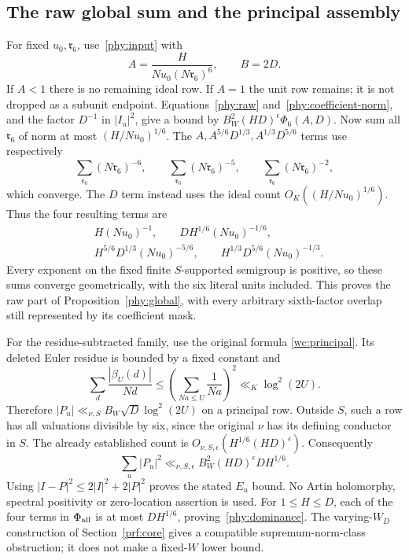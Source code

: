 \documentclass[11pt]{article}
\theoremstyle{definition}\newtheorem{definition}[theorem]{Definition}
\theoremstyle{remark}\newtheorem{remark}[theorem]{Remark}
\begin{document}
\subsection{The raw global sum and the principal assembly}\label{phy:r6-sums}
For fixed $u_0,\mathfrak r_6$, use~\eqref{phy:input} with
\[
 A=\frac{H}{Nu_0(N\mathfrak r_6)^6},\qquad B=2D.
\]
If $A<1$ there is no remaining ideal row. If $A=1$ the unit row remains;
it is not dropped as a subunit endpoint. Equations~\eqref{phy:raw}
and~\eqref{phy:coefficient-norm}, and the factor $D^{-1}$ in $|I_u|^2$,
give a bound by $B_W^2(HD)^\epsilon\Phi_6(A,D)$.
Now sum all $\mathfrak r_6$ of norm at most $(H/Nu_0)^{1/6}$.
The $A,A^{5/6}D^{1/3},A^{1/3}D^{5/6}$ terms use respectively
\[
 \sum_{\mathfrak r_6}(N\mathfrak r_6)^{-6},\qquad
 \sum_{\mathfrak r_6}(N\mathfrak r_6)^{-5},\qquad
 \sum_{\mathfrak r_6}(N\mathfrak r_6)^{-2},
\]
which converge. The $D$ term instead uses the ideal count
$O_K((H/Nu_0)^{1/6})$. Thus the four resulting terms are
\begin{equation}\label{phy:S-sums}
 \begin{aligned}
 &H(Nu_0)^{-1},\qquad DH^{1/6}(Nu_0)^{-1/6},\\
 &H^{5/6}D^{1/3}(Nu_0)^{-5/6},\qquad
       H^{1/3}D^{5/6}(Nu_0)^{-1/3}.
 \end{aligned}
\end{equation}
Every exponent on the fixed finite $S$-supported semigroup is positive,
so these sums converge geometrically, with the six literal units included.
This proves the raw part of Proposition~\ref{phy:global}, with every
arbitrary sixth-factor overlap still represented by its coefficient mask.

For the residue-subtracted family, use the original formula
\eqref{wc:principal}. Its deleted Euler residue is bounded by a fixed
constant and
\[
 \sum_d\frac{|\beta_U(d)|}{Nd}
   \le\left(\sum_{Na\le U}\frac1{Na}\right)^2
   \ll_K\log^2(2U).
\]
Therefore $|P_u|\ll_{\nu,S}B_W\sqrt D\log^2(2U)$ on a principal row.
Outside $S$, such a row has all valuations divisible by six, since the
original $\nu$ has its defining conductor in $S$. The already established
count is $O_{\nu,S,\epsilon}(H^{1/6}(HD)^\epsilon)$. Consequently
\begin{equation}\label{phy:principal-proof}
 \sum_u|P_u|^2\ll_{\nu,S,\epsilon}
               B_W^2(HD)^\epsilon DH^{1/6}.
\end{equation}
Using $|I-P|^2\le2|I|^2+2|P|^2$ proves the stated $E_u$ bound.
No Artin holomorphy, spectral positivity or zero-location assertion is used.
For $1\le H\le D$, each of the four terms in $\Phi_{\rm all}$ is at most
$DH^{1/6}$, proving~\eqref{phy:dominance}.
The varying-$W_D$ construction of Section~\ref{prf:core} gives a compatible
supremum-norm-class obstruction; it does not make a fixed-$W$ lower bound.
\end{document}
